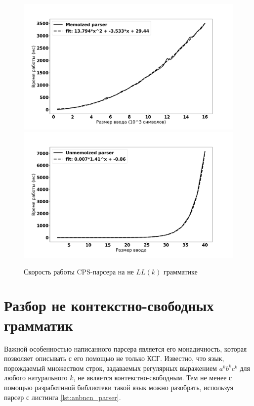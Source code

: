 \documentclass[times]{itmo-student-thesis}
\begin{document}
\begin{figure}[!h]
  \caption{Скорость работы CPS-парсера на не $LL(k)$ грамматике}\label{fig:notllk_plot} %
  \includegraphics[width=0.8\paperwidth]{./images/notllk_memo.png}
  \includegraphics[width=0.8\paperwidth]{./images/notllk_unmemo.png}
\end{figure}

\section{Разбор не контекстно-свободных грамматик}\label{sec:non_context_free}

Важной особенностью написанного парсера является его монадичность, которая позволяет описывать с его помощью не только 
КСГ. Известно, что язык, порождаемый множеством строк, задаваемых регулярных выражением $a^kb^kc^k$ для любого натурального $k$, 
не является контекстно-свободным. Тем не менее с помощью разработнной библиотеки такой язык можно разобрать, используя парсер с листинга 
\ref{lst:anbncn_parser}.
\end{document}
